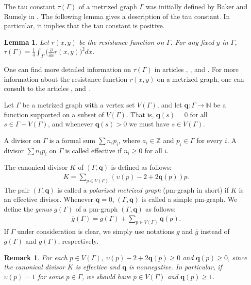 \documentclass[12pt]{amsart}
\newtheorem{lemma}[theorem]{Lemma}
\theoremstyle{example}
\newtheorem{remark}[theorem]{Remark}
\theoremstyle{definition}
\theoremstyle{notation}
\begin{document}
The tau constant ${\tau(\Gamma)}$ of a metrized graph ${\Gamma}$ was initially defined by Baker and Rumely in \cite[Section 14]{BRh}.
The following lemma gives a description of the tau constant. In particular, it implies that the tau constant is positive.
\begin{lemma}\cite[Lemma 14.4]{BRh}\label{lemtauformula}
Let $r(x,y)$ be the resistance function on ${\Gamma}$. For any fixed $y$ in ${\Gamma}$,
${\tau(\Gamma)} =\frac{1}{4}\int_{\Gamma}\big(\frac{\partial}{\partial x} r(x,y) \big)^2dx$.
\end{lemma}
One can find more detailed information on ${\tau(\Gamma)}$ in articles \cite{C1}, \cite{C2}, \cite{C3} and \cite{C6}.
For more information about the resistance function $r(x,y)$ on a metrized graph, one can consult to
the articles \cite{BRh}, \cite{BF} and \cite{C2}.

Let ${\Gamma}$ be a metrized graph with a vertex set ${V({\Gamma})}$, and let ${\textbf{q}} : {\Gamma} \rightarrow  {{\mathbb N}}$
be a function supported on a subset of ${V({\Gamma})}$. That is, ${\textbf{q}}(s)=0$ for all $s \in {\Gamma}-{V({\Gamma})}$, and whenever ${\textbf{q}}(s) > 0$ we must have $s \in {V({\Gamma})}$.

A divisor on ${\Gamma}$ is a formal sum $\sum n_i p_i$, where $a_i \in {{\mathbb Z}}$ and $p_i \in {\Gamma}$ for every $i$.
A divisor $\sum n_i p_i$ on ${\Gamma}$ is called effective if $n_i \geq 0$ for all $i$.

The canonical divisor $K$ of $({\Gamma},{\textbf{q}})$ is defined as follows:
\begin{equation}\label{eqn app2a}
\begin{split}
K  = \sum_{p \in {V({\Gamma})}} ({\upsilon}(p)-2+2 {\textbf{q}} (p))p.
\end{split}
\end{equation}
The pair $({\Gamma},{\textbf{q}})$ is called a \textit{polarized metrized graph} (pm-graph in short) if $K$ is an effective divisor. Whenever ${\textbf{q}}=0$, $({\Gamma},{\textbf{q}})$ is called a simple pm-graph. We define the \textit{genus} ${\bar{g}} ({\Gamma})$ of a pm-graph $({\Gamma},{\textbf{q}})$ as follows:
\begin{equation}\label{eqn genus}
\begin{split}
{\bar{g}} ({\Gamma}) =g({\Gamma})+\sum_{p \in {V({\Gamma})}}{\textbf{q}} (p).
\end{split}
\end{equation}
If ${\Gamma}$ under consideration is clear, we simply use notations $g$ and ${\bar{g}}$ instead of ${\bar{g}}({\Gamma})$ and $g({\Gamma})$, respectively.
\begin{remark}\label{rem effective}
For each $p \in {V({\Gamma})}$, ${\upsilon}(p)-2+2 {\textbf{q}} (p) \geq 0$ and ${\textbf{q}} (p)\geq 0$, since the canonical divisor
$K$ is effective and ${\textbf{q}}$ is nonnegative. In particular, if ${\upsilon}(p)=1$ for some $p \in {\Gamma}$, we should have $p \in {V({\Gamma})}$ and ${\textbf{q}} (p) \geq 1$.
\end{remark}
\end{document}
